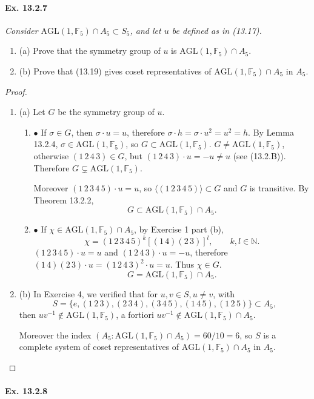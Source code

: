 \documentclass[11pt,a4paper]{article}
\newcommand{\be} {\begin{enumerate}}
\newcommand{\ee} {\end{enumerate}}
\newcommand{\N}{\mathbb{N}}
\newcommand{\F}{\mathbb{F}}
\begin{document}
\paragraph{Ex. 13.2.7}

{\it Consider $\mathrm{AGL}(1,\F_5) \cap A_5 \subset S_5$, and let $u$ be defined as in (13.17).
\be
\item[(a)] Prove that the symmetry group of $u$ is $\mathrm{AGL}(1,\F_5) \cap A_5 $.
\item[(b)] Prove that (13.19) gives coset representatives of $\mathrm{AGL}(1,\F_5) \cap A_5 $ in $A_5$.
\ee
}

\begin{proof}
\be
\item[(a)]
 Let $G$ be the symmetry group of $u$.
	\be
	\item[$\bullet$] If $\sigma \in G$, then $\sigma \cdot u = u$, therefore $\sigma \cdot h = \sigma \cdot u^2= u^2 = h$. By Lemma 13.2.4, $\sigma \in \mathrm{AGL}(1,\F_5)$, so $G \subset \mathrm{AGL}(1,\F_5)$.
	$G \ne \mathrm{AGL}(1,\F_5)$, otherwise $ (1\,2\,4\,3) \in G$, but $(1\,2\,4\,3) \cdot u = -u \ne u$ (see (13.2.B)). Therefore $G \subsetneq \mathrm{AGL}(1,\F_5)$. 
	
	Moreover $(1\,2\,3\,4\,5) \cdot u = u$, so $\langle  (1\,2\,3\,4\,5) \rangle \subset G$ and $G$ is transitive. By Theorem 13.2.2, 
	$$G \subset \mathrm{AGL}(1,\F_5) \cap A_5 .$$
	
	\item[$\bullet$] If $\chi \in \mathrm{AGL}(1,\F_5) \cap A_5$, by Exercise 1 part (b), 
	$$\chi =  (1\,2\,3\,4\,5)^k [(1\,4)(2\, 3)]^l, \qquad k,l \in \N.$$
	$(1\,2\,3\,4\,5)\cdot u = u$ and $ (1\,2\,4\,3) \cdot u = -u$, therefore $(1\,4)(2\, 3)\cdot u = (1\,2\,4\,3)^2\cdot u = u$. Thus $\chi \in G$.
	$$G = \mathrm{AGL}(1,\F_5) \cap A_5 .$$

	\ee
	
\item[(b)] In Exercise 4, we verified that for $u,v \in S, u\ne v$, with
$$S = \{e, (1\,2\,3), (2\,3\,4), (3\,4\,5), (1\,4\,5),(1\,2\,5)\} \subset  A_5,$$
then $u v^{-1} \not \in \mathrm{AGL}(1,\F_5)$, a fortiori $u v^{-1} \not \in \mathrm{AGL}(1,\F_5) \cap A_5$.

Moreover the index $(A_5 : \mathrm{AGL}(1,\F_5) \cap A_5) = 60 / 10 = 6 $, so $S$ is a complete system of coset representatives of $\mathrm{AGL}(1,\F_5) \cap A_5 $ in $A_5$.
\ee
\end{proof}

\paragraph{Ex. 13.2.8}
\end{document}
